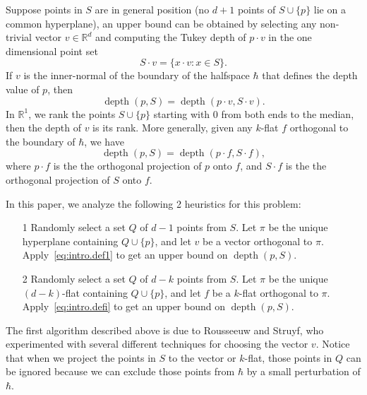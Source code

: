 \documentclass{patmorin}
\DeclareMathOperator{\depth}{depth}
\begin{document}
Suppose points in $S$ are in general position (no $d + 1$ points of $S \cup \{ p \}$ lie on a common hyperplane), an upper bound can be obtained by selecting any non-trivial vector $v \in \mathbb{R}^{d}$ and computing the Tukey depth of $p \cdot v$ in the one dimensional point set
\begin{equation}
  \label{eq:intro.1dset}
  S \cdot v = \{x \cdot v : x \in S \}. \tag{$\ast$}
\end{equation}
If $v$ is the inner-normal of the boundary of the halfspace $\hbar$ that defines the depth value of $p$, then
\begin{equation}
  \label{eq:intro.def1}
  \depth{(p, S)} = \depth{(p \cdot v, S \cdot v)}.
\end{equation}
In $\mathbb{R}^{1}$, we rank the points $S \cup \{ p \}$ starting with $0$ from both ends to the median, then the depth of $v$ is its rank. More generally, given any $k$-flat $f$ orthogonal to the boundary of $\hbar$, we have
\begin{equation}
  \label{eq:intro.defi}
  \depth{(p, S)} = \depth{(p \cdot f, S \cdot f)},
\end{equation}
where $p \cdot f$ is the the orthogonal projection of $p$ onto $f$, and $S \cdot f$ is the the orthogonal projection of $S$ onto $f$.


In this paper, we analyze the following 2 heuristics for this problem:
\begin{itemize}
\item [1] Randomly select a set $Q$ of $d - 1$ points from $S$. Let $\pi$ be the unique hyperplane containing $Q \cup \{p\}$, and let $v$ be a vector orthogonal to $\pi$. Apply~\eqref{eq:intro.def1} to get an upper bound on $\depth{(p, S)}$.\label{page:heuristic1}
\item [2] Randomly select a set $Q$ of $d - k$ points from $S$. Let $\pi$ be the unique $(d - k)$-flat containing $Q \cup \{p\}$, and let $f$ be a $k$-flat orthogonal to $\pi$. Apply~\eqref{eq:intro.defi} to get an upper bound on $\depth{(p, S)}$.\label{page:heuristic2}
\end{itemize}
The first algorithm described above is due to Rousseeuw and Struyf, who experimented with several different techniques for choosing the vector $v$. Notice that when we project the points in $S$ to the vector or $k$-flat, those points in $Q$ can be ignored because we can exclude those points from $\hbar$ by a small perturbation of $\hbar$.
\end{document}
